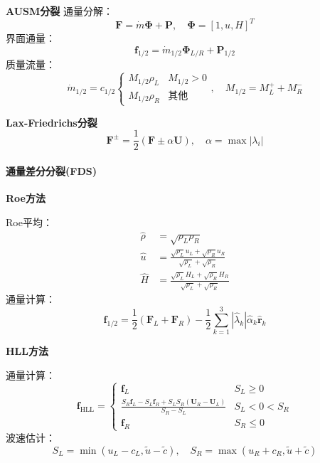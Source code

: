 \documentclass[UTF8]{ctexart}
\begin{document}
\textbf{AUSM分裂}
\cite{liou1996}
通量分解：
\begin{equation}
\mathbf{F} = \dot{m}\mathbf{\Phi} + \mathbf{P}, \quad \mathbf{\Phi} = [1, u, H]^T
\end{equation}
界面通量：
\begin{equation}
\mathbf{f}_{1/2} = \dot{m}_{1/2}\mathbf{\Phi}_{L/R} + \mathbf{P}_{1/2}
\end{equation}
质量流量：
\begin{equation}
\dot{m}_{1/2} = c_{1/2} \begin{cases}
M_{1/2} \rho_L & M_{1/2} > 0 \\
M_{1/2} \rho_R & \text{其他}
\end{cases}, \quad M_{1/2} = M_L^+ + M_R^-
\end{equation}

\textbf{Lax-Friedrichs分裂}
\begin{equation}
\mathbf{F}^\pm = \frac{1}{2} (\mathbf{F} \pm \alpha \mathbf{U}), \quad \alpha = \max|\lambda_i|
\end{equation}

\paragraph{通量差分分裂(FDS)}

\textbf{Roe方法}

Roe平均：
\begin{align}
\hat{\rho} &= \sqrt{\rho_L \rho_R} \\
\hat{u} &= \frac{\sqrt{\rho_L}u_L + \sqrt{\rho_R}u_R}{\sqrt{\rho_L} + \sqrt{\rho_R}} \\
\hat{H} &= \frac{\sqrt{\rho_L}H_L + \sqrt{\rho_R}H_R}{\sqrt{\rho_L} + \sqrt{\rho_R}}
\end{align}
通量计算：
\begin{equation}
\mathbf{f}_{1/2} = \frac{1}{2} \left( \mathbf{F}_L + \mathbf{F}_R \right) - \frac{1}{2} \sum_{k=1}^{3} |\hat{\lambda}_k| \hat{\alpha}_k \hat{\mathbf{r}}_k
\end{equation}

\textbf{HLL方法}

通量计算：
\begin{equation}
\mathbf{f}_{\text{HLL}} = \begin{cases} 
\mathbf{f}_L & S_L \geq 0 \\
\frac{S_R\mathbf{f}_L - S_L\mathbf{f}_R + S_LS_R(\mathbf{U}_R - \mathbf{U}_L)}{S_R - S_L} & S_L < 0 < S_R \\
\mathbf{f}_R & S_R \leq 0
\end{cases}
\end{equation}
波速估计：
\begin{equation}
S_L = \min(u_L - c_L, \tilde{u} - \tilde{c}), \quad S_R = \max(u_R + c_R, \tilde{u} + \tilde{c})
\end{equation}
\end{document}

